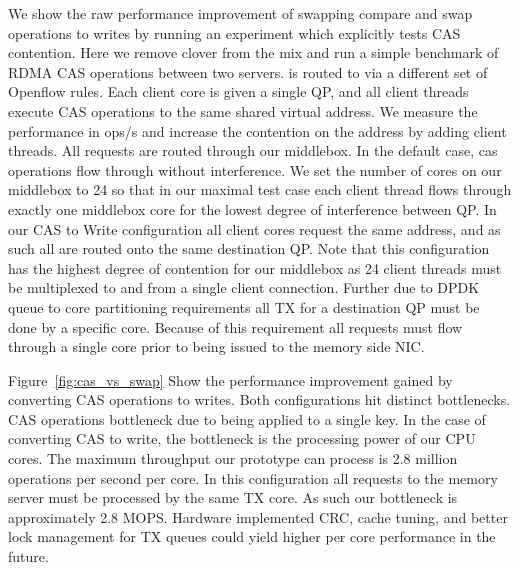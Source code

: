 We show the raw performance improvement of swapping compare and swap operations
to writes by running an experiment which explicitly tests CAS contention. Here
we remove clover from the mix and run a simple benchmark of RDMA CAS operations
between two servers. \sword is routed to via a different set of Openflow rules.
Each client core is given a single QP, and all client threads execute CAS
operations to the same shared virtual address. We measure the performance in
ops/s and increase the contention on the address by adding client threads. All
requests are routed through our middlebox. In the default case, cas operations
flow through without interference. We set the number of cores on our middlebox
to 24 so that in our maximal test case each client thread flows through exactly
one middlebox core for the lowest degree of interference between QP. In our CAS
to Write configuration all client cores request the same address, and as such
all are routed onto the same destination QP. Note that this configuration has
the highest degree of contention for our middlebox as 24 client threads must be
multiplexed to and from a single client connection. Further due to DPDK queue to
core partitioning requirements all TX for a destination QP must be done by a
specific core. Because of this requirement all requests must flow through a
single core prior to being issued to the memory side NIC.

Figure~\ref{fig:cas_vs_swap} Show the performance improvement gained by
converting CAS operations to writes. Both configurations hit distinct
bottlenecks. CAS operations bottleneck due to being applied to a single key. In
the case of converting CAS to write, the bottleneck is the processing power of
our CPU cores. The maximum throughput our prototype can process is 2.8 million
operations per second per core. In this configuration all requests to the memory
server must be processed by the same TX core. As such our bottleneck is
approximately 2.8 MOPS. Hardware implemented CRC, cache tuning, and better lock
management for TX queues could yield higher per core performance in the future.